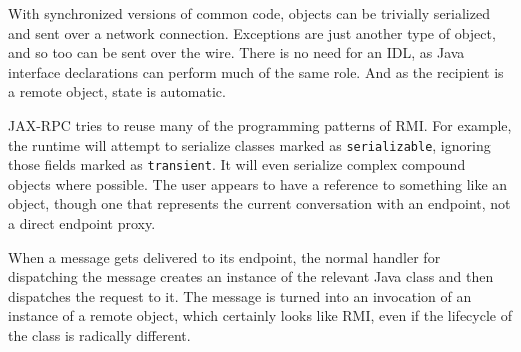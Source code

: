 With synchronized versions of common code, objects can be trivially
serialized and sent over a network connection. Exceptions are just
another type of object, and so too can be sent over the wire. There is
no need for an IDL, as Java interface declarations can perform much of
the same role. And as the recipient is a remote object, state is
automatic.

JAX-RPC tries to reuse many of the programming patterns of RMI. For
example, the runtime will attempt to serialize classes marked as
\verb|serializable|, ignoring those fields marked as
\verb|transient|. It will even serialize complex compound objects where
possible. The user appears to have a reference to something like an
object, though one that represents the current conversation with an
endpoint, not a direct endpoint proxy.

When a message gets delivered to its endpoint, the normal handler for
dispatching the message creates an instance of the relevant Java class
and then dispatches the request to it. The message is turned into an
invocation of an instance of a remote object, which certainly looks
like RMI, even if the lifecycle of the class is radically different.

%

